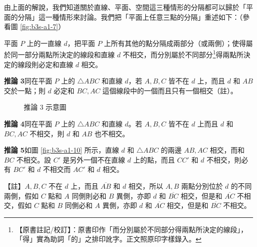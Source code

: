 由上面的解說，我們知道關於直線、平面、空間這三種情形的分隔都可以歸於「平面的分隔」這一種情形來討論。我們把「平面上任意三點的分隔」重述如下：（參看圖 \ref{fig:b3s-a1-7}）

平面 $P$ 上的一直線 $d$，把平面 $P$ 上所有其他的點分隔成兩部分（或兩側）；使得屬於同一部分兩點所決定的線段和直線 $d$ 不相交，而分別屬於不同部分\label{note:b3s-a1-p266-de}\footnote{【原書註記/校訂】：原書印作「而分別屬於不同部分得兩點所決定的線段」，「得」實為助詞「的」之排印訛字。正文照原印字樣錄入。}得兩點所決定的線段則必定和直線 $d$ 相交。

\noindent\textbf{推論 3}\quad 同在平面 $P$ 上的 $\triangle ABC$ 和直線 $d$，若 $A, B, C$ 皆不在 $d$ 上，而且 $d$ 和 $AB$ 交於一點；則 $d$ 必定和 $BC, AC$ 這個線段中的一個而且只有一個相交（註）。

\begin{figure}[H]
\centering
{}
\caption{推論 3 示意圖}
\label{fig:b3s-a1-9}
\end{figure}

\noindent\textbf{推論 4}\quad 同在平面 $P$ 上的 $\triangle ABC$ 和直線 $d$。若 $A, B, C$ 皆不在 $d$ 上而且 $d$ 和 $BC, AC$ 不相交，則 $d$ 和 $AB$ 也不相交。

\noindent\textbf{推論 5}\quad 如圖 \ref{fig:b3s-a1-10} 所示，直線 $d$ 和 $\triangle ABC$ 的兩邊 $AB, AC$ 相交，而和 $BC$ 不相交。設 $C'$ 是另外一個不在直線 $d$ 上的點，而且 $CC'$ 和 $d$ 不相交，則必有 $BC'$ 和 $d$ 不相交而 $AC'$ 和 $d$ 相交。

\noindent【註】\quad $A, B, C$ 不在 $d$ 上，而且 $\overline{AB}$ 和 $d$ 相交，所以 $A, B$ 兩點分別位於 $d$ 的不同兩側，假如 $C$ 點和 $A$ 同側則必和 $B$ 異側，亦即 $d$ 和 $\overline{BC}$ 相交，但是和 $\overline{AC}$ 不相交，假如 $C$ 點和 $B$ 同側必和 $A$ 異側，亦即 $d$ 和 $\overline{AC}$ 相交，但是和 $\overline{BC}$ 不相交。

